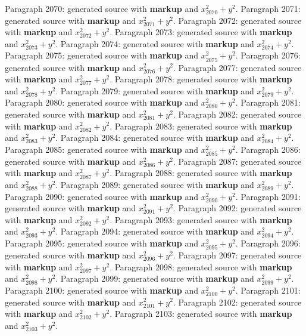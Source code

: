 \documentclass{article}
\begin{document}
Paragraph 2070: generated source with \textbf{markup} and $x_{2070}^2 + y^2$.
Paragraph 2071: generated source with \textbf{markup} and $x_{2071}^2 + y^2$.
Paragraph 2072: generated source with \textbf{markup} and $x_{2072}^2 + y^2$.
Paragraph 2073: generated source with \textbf{markup} and $x_{2073}^2 + y^2$.
Paragraph 2074: generated source with \textbf{markup} and $x_{2074}^2 + y^2$.
Paragraph 2075: generated source with \textbf{markup} and $x_{2075}^2 + y^2$.
Paragraph 2076: generated source with \textbf{markup} and $x_{2076}^2 + y^2$.
Paragraph 2077: generated source with \textbf{markup} and $x_{2077}^2 + y^2$.
Paragraph 2078: generated source with \textbf{markup} and $x_{2078}^2 + y^2$.
Paragraph 2079: generated source with \textbf{markup} and $x_{2079}^2 + y^2$.
Paragraph 2080: generated source with \textbf{markup} and $x_{2080}^2 + y^2$.
Paragraph 2081: generated source with \textbf{markup} and $x_{2081}^2 + y^2$.
Paragraph 2082: generated source with \textbf{markup} and $x_{2082}^2 + y^2$.
Paragraph 2083: generated source with \textbf{markup} and $x_{2083}^2 + y^2$.
Paragraph 2084: generated source with \textbf{markup} and $x_{2084}^2 + y^2$.
Paragraph 2085: generated source with \textbf{markup} and $x_{2085}^2 + y^2$.
Paragraph 2086: generated source with \textbf{markup} and $x_{2086}^2 + y^2$.
Paragraph 2087: generated source with \textbf{markup} and $x_{2087}^2 + y^2$.
Paragraph 2088: generated source with \textbf{markup} and $x_{2088}^2 + y^2$.
Paragraph 2089: generated source with \textbf{markup} and $x_{2089}^2 + y^2$.
Paragraph 2090: generated source with \textbf{markup} and $x_{2090}^2 + y^2$.
Paragraph 2091: generated source with \textbf{markup} and $x_{2091}^2 + y^2$.
Paragraph 2092: generated source with \textbf{markup} and $x_{2092}^2 + y^2$.
Paragraph 2093: generated source with \textbf{markup} and $x_{2093}^2 + y^2$.
Paragraph 2094: generated source with \textbf{markup} and $x_{2094}^2 + y^2$.
Paragraph 2095: generated source with \textbf{markup} and $x_{2095}^2 + y^2$.
Paragraph 2096: generated source with \textbf{markup} and $x_{2096}^2 + y^2$.
Paragraph 2097: generated source with \textbf{markup} and $x_{2097}^2 + y^2$.
Paragraph 2098: generated source with \textbf{markup} and $x_{2098}^2 + y^2$.
Paragraph 2099: generated source with \textbf{markup} and $x_{2099}^2 + y^2$.
Paragraph 2100: generated source with \textbf{markup} and $x_{2100}^2 + y^2$.
Paragraph 2101: generated source with \textbf{markup} and $x_{2101}^2 + y^2$.
Paragraph 2102: generated source with \textbf{markup} and $x_{2102}^2 + y^2$.
Paragraph 2103: generated source with \textbf{markup} and $x_{2103}^2 + y^2$.
\end{document}
